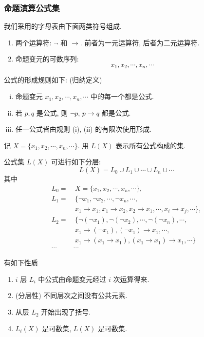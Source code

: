 \documentclass[
    color=black,
    device=normal,
    lang=cn
]{elegantnote}
\begin{document}
\subsubsection{命题演算公式集}
\begin{definition}[命题演算公式]
    我们采用的字母表由下面两类符号组成.
    \begin{enumerate}[(1), topsep = -1em]
        \item 两个运算符: $\lnot$ 和 $\to$.
              前者为一元运算符, 后者为二元运算符.
        \item 命题变元的可数序列:
              $$
                  x_1, x_2, \cdots, x_n, \cdots
              $$
    \end{enumerate}
    公式的形成规则如下: (归纳定义)
    \begin{enumerate}[(i), topsep = -1em]
        \item 命题变元 $x_1, x_2, \cdots, x_n, \cdots$ 中的每一个都是公式.
        \item 若 $p, q$ 是公式, 则 $\lnot p$, $p\to q$ 都是公式.
        \item 任一公式皆由规则 (i), (ii) 的有限次使用形成.
    \end{enumerate}
\end{definition}
\begin{definition}[公式集的分层]
    记 $X=\{x_1, x_2, \cdots, x_n, \cdots\}$. 用 $L(X)$ 表示所有公式构成的集.

    公式集 $L(X)$ 可进行如下分层:
    $$
        L(X)=L_0\cup L_1\cup \cdots\cup L_n \cup\cdots
    $$
    其中
    \begin{align*}
        L_0=   & \ X=\{x_1, x_2, \cdots, x_n, \cdots\},                                    \\
        L_1=   & \ \{\lnot x_1, \lnot x_2,\cdots,\lnot x_n,\cdots,                         \\
               & \ x_1\to x_1, x_1\to x_2, x_2\to x_1,\cdots,x_i\to x_j,\cdots\},          \\
        L_2=   & \ \{\lnot (\lnot x_1), \lnot (\lnot x_2),\cdots,\lnot (\lnot x_n),\cdots, \\
               & \ x_1\to (\lnot x_1), (\lnot x_1)\to x_1, \cdots,                         \\
               & \ x_1\to (x_1\to x_1), (x_1\to x_1)\to x_1, \cdots\}                      \\
        \cdots & \cdots
    \end{align*}
\end{definition}
有如下性质
\begin{enumerate}[(1), topsep = -1em]
    \item $i$ 层 $L_i$ 中公式由命题变元经过 $i$ 次运算得来.
    \item (分层性) 不同层次之间没有公共元素.
    \item 从层 $L_2$ 开始出现了括号.
    \item $L_i(X)$ 是可数集, $L(X)$ 是可数集.
\end{enumerate}
\end{document}
